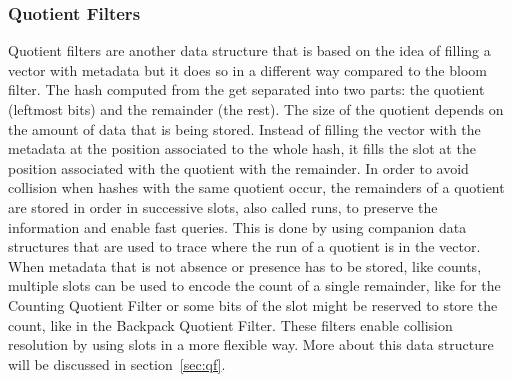 \subsubsection{Quotient Filters}
Quotient filters are another data structure that is based on the idea of filling a vector with metadata but it does so in a different way compared to the bloom filter.
The hash computed from the \kmer get separated into two parts: the quotient (leftmost bits) and the remainder (the rest). The size of the quotient depends on the amount of data that is being stored. Instead of filling the vector with the metadata at the position associated to the whole hash, it fills the slot at the position associated with the quotient with the remainder. In order to avoid collision when hashes with the same quotient occur, the remainders of a quotient are stored in order in successive slots, also called runs, to preserve the information and enable fast queries. This is done by using companion data structures that are used to trace where the run of a quotient is in the vector. When metadata that is not absence or presence has to be stored, like counts, multiple slots can be used to encode the count of a single remainder, like for the Counting Quotient Filter or some bits of the slot might be reserved to store the count, like in the Backpack Quotient Filter.
These filters enable collision resolution by using slots in a more flexible way. More about this data structure will be discussed in section~\ref{sec:qf}.

